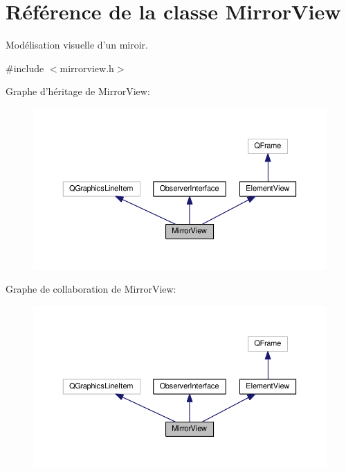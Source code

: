 \hypertarget{classMirrorView}{\section{Référence de la classe Mirror\+View}
\label{classMirrorView}
}


Modélisation visuelle d’un miroir.  




{\ttfamily \#include $<$mirrorview.\+h$>$}



Graphe d'héritage de Mirror\+View\+:\nopagebreak
\begin{figure}[H]
\begin{center}
\leavevmode
\includegraphics[width=350pt]{d2/d7b/classMirrorView__inherit__graph}
\end{center}
\end{figure}


Graphe de collaboration de Mirror\+View\+:\nopagebreak
\begin{figure}[H]
\begin{center}
\leavevmode
\includegraphics[width=350pt]{d1/de7/classMirrorView__coll__graph}
\end{center}
\end{figure}
